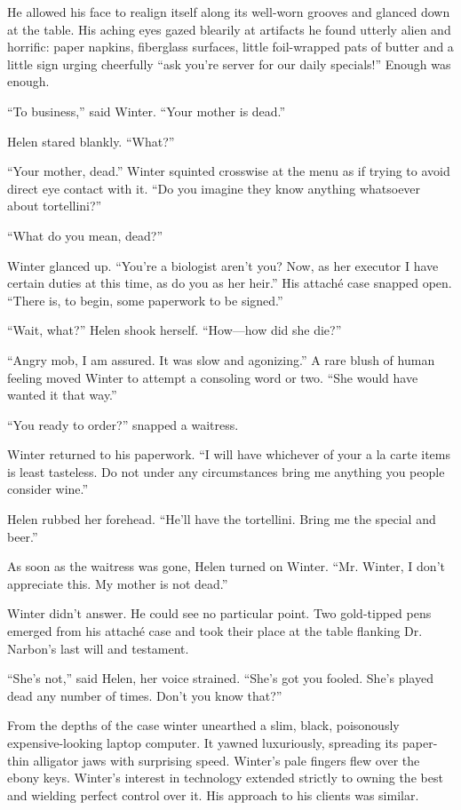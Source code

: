 \documentclass[ebook,10pt]{memoir}
\begin{document}
He allowed his face to realign itself along its well-worn grooves and
glanced down at the table. His aching eyes gazed blearily at artifacts
he found utterly alien and horrific: paper napkins, fiberglass
surfaces, little foil-wrapped pats of butter and a little sign urging
cheerfully ``ask you're server for our daily specials!'' Enough was
enough.

``To business,'' said Winter. ``Your mother is dead.''

Helen stared blankly. ``What?''

``Your mother, dead.'' Winter squinted crosswise at the menu as if
trying to avoid direct eye contact with it. ``Do you imagine they know
anything whatsoever about tortellini?''

``What do you mean, dead?''

Winter glanced up. ``You're a biologist aren't you? Now, as her
executor I have certain duties at this time, as do you as her heir.''
His attach\'{e} case snapped open. ``There is, to begin, some
paperwork to be signed.''

``Wait, what?'' Helen shook herself. ``How---how did she die?''

``Angry mob, I am assured. It was slow and agonizing.'' A rare blush
of human feeling moved Winter to attempt a consoling word or
two. ``She would have wanted it that way.''

``You ready to order?'' snapped a waitress.

Winter returned to his paperwork. ``I will have whichever of your a la
carte items is least tasteless. Do not under any circumstances bring
me anything you people consider wine.''

Helen rubbed her forehead. ``He'll have the tortellini. Bring me the
special and beer.''

As soon as the waitress was gone, Helen turned on Winter. ``Mr. Winter,
I don't appreciate this. My mother is not dead.''

Winter didn't answer. He could see no particular point. Two
gold-tipped pens emerged from his attach\'{e} case and took their
place at the table flanking Dr. Narbon's last will and testament.

``She's not,'' said Helen, her voice strained. ``She's got you
fooled. She's played dead any number of times. Don't you know that?''

From the depths of the case winter unearthed a slim, black,
poisonously expensive-looking laptop computer. It yawned luxuriously,
spreading its paper-thin alligator jaws with surprising
speed. Winter's pale fingers flew over the ebony keys. Winter's
interest in technology extended strictly to owning the best and
wielding perfect control over it. His approach to his clients was
similar.
\end{document}
